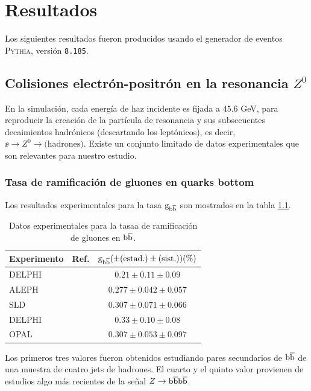 \chapter{Resultados}
\label{sec:results}

Los siguientes resultados fueron producidos usando el generador de eventos \textsc{Pythia}, versión \verb|8.185|.

\section{Colisiones electrón-positrón en la resonancia $Z^0$}

En la simulación, cada energía de haz incidente es fijada a $45.6$ GeV, para reproducir la creación de la partícula de resonancia y sus subsecuentes decaimientos hadrónicos (descartando los leptónicos), es decir, $\ee\to Z^0\to \mbox{(hadrones)}$. Existe un conjunto limitado de datos experimentales que son relevantes para nuestro estudio.

\subsection{Tasa de ramificación de gluones en quarks bottom}

Los resultados experimentales para la tasa ${\mathrm g}_{{\mathrm b}\overline{\mathrm b}}$ son mostrados en la tabla \ref{table:gbbMeasurements}.

\begin{table}[!h]
\caption{Datos experimentales para la tasaa de ramificación de gluones en ${\mathrm b}\overline{\mathrm b}$.}\smallskip
\label{table:gbbMeasurements}
\centering 
\begin{tabular}{lcc}
\hline \hline  
\smallskip
Experimento & Ref. & ${\mathrm g}_{{\mathrm b}\overline{\mathrm b}} (\pm(\text{estad.})\pm(\text{sist.})) (\%)$ \\ 
\hline
DELPHI & \cite{Abreu:1997nf} &  $0.21\pm0.11\pm0.09$ \\
ALEPH & \cite{Barate:1998vs} & $0.277\pm0.042\pm0.057$ \\
SLD & \cite{Abe:1999qg} & $0.307\pm0.071\pm0.066$ \\
DELPHI & \cite{Abreu:1999qh} & $0.33\pm0.10\pm0.08$ \\
OPAL & \cite{Abbiendi:2000zt} & $0.307\pm0.053\pm0.097$ \\
\end{tabular}
\end{table}

Los primeros tres valores fueron obtenidos estudiando pares secundarios de ${\mathrm b}\overline{\mathrm b}$ de una muestra de cuatro jets de hadrones. El cuarto y el quinto valor provienen de estudios algo más recientes de la señal $Z\to{\mathrm b}\overline{\mathrm b}{\mathrm b}\overline{\mathrm b}$.

